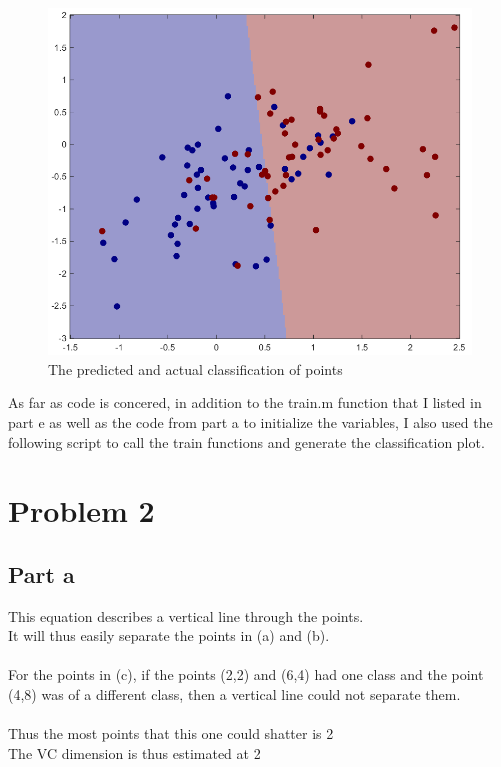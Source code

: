 \documentclass[twoside,11pt]{article}
\theoremstyle{definition}
\begin{document}
\begin{figure}[h]
\centering
\includegraphics[width=5 in]{prob1fPlotB2.png}
\caption{The predicted and actual classification of points}
\end{figure}

As far as code is concered, in addition to the train.m function that I listed in part e as well as the code from part a to initialize the variables, I also used the following script to call the train functions and generate the classification plot.


\newpage

\section*{Problem 2}

\subsection*{Part a}

This equation describes a vertical line through the points.\\
It will thus easily separate the points in (a) and (b).\\
\\
For the points in (c), if the points (2,2) and (6,4) had one class and the point (4,8) was of a different class, then a vertical line could not separate them.\\
\\
Thus the most points that this one could shatter is 2\\
The VC dimension is thus estimated at 2
\end{document}
